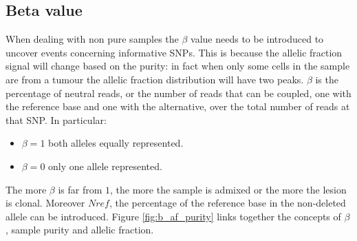 	\subsection{Beta value}
	When dealing with non pure samples the $\beta$ value needs to be introduced to uncover events concerning informative SNPs.
	This is because the allelic fraction signal will change based on the purity: in fact when only some cells in the sample are from a tumour the allelic fraction distribution will have two peaks.
	$\beta$ is the percentage of neutral reads, or the number of reads that can be coupled, one with the reference base and one with the alternative, over the total number of reads at that SNP.
	In particular:

	\begin{multicols}{2}
		\begin{itemize}
			\item $\beta = 1$ both alleles equally represented.
			\item $\beta = 0$ only one allele represented.
		\end{itemize}
	\end{multicols}

	The more $\beta$ is far from $1$, the more the sample is admixed or the more the lesion is clonal.
	Moreover $Nref$, the percentage of the reference base in the non-deleted allele can be introduced.
	Figure \ref{fig:b_af_purity} links together the concepts of $\beta$, sample purity and allelic fraction.

